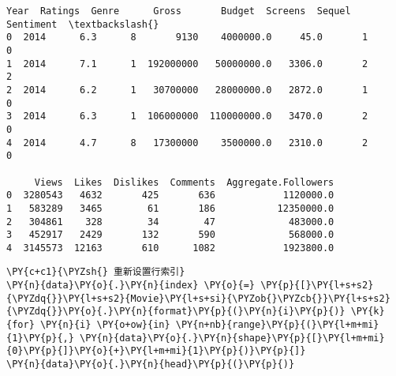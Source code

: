             \begin{tcolorbox}[breakable, size=fbox, boxrule=.5pt, pad at break*=1mm, opacityfill=0]
\begin{Verbatim}[commandchars=\\\{\}]
   Year  Ratings  Genre      Gross       Budget  Screens  Sequel  Sentiment  \textbackslash{}
0  2014      6.3      8       9130    4000000.0     45.0       1          0
1  2014      7.1      1  192000000   50000000.0   3306.0       2          2
2  2014      6.2      1   30700000   28000000.0   2872.0       1          0
3  2014      6.3      1  106000000  110000000.0   3470.0       2          0
4  2014      4.7      8   17300000    3500000.0   2310.0       2          0

     Views  Likes  Dislikes  Comments  Aggregate.Followers
0  3280543   4632       425       636            1120000.0
1   583289   3465        61       186           12350000.0
2   304861    328        34        47             483000.0
3   452917   2429       132       590             568000.0
4  3145573  12163       610      1082            1923800.0
\end{Verbatim}
\end{tcolorbox}
        
    \begin{tcolorbox}[breakable, size=fbox, boxrule=1pt, pad at break*=1mm,colback=cellbackground, colframe=cellborder]
\begin{Verbatim}[commandchars=\\\{\}]
\PY{c+c1}{\PYZsh{} 重新设置行索引}
\PY{n}{data}\PY{o}{.}\PY{n}{index} \PY{o}{=} \PY{p}{[}\PY{l+s+s2}{\PYZdq{}}\PY{l+s+s2}{Movie}\PY{l+s+si}{\PYZob{}\PYZcb{}}\PY{l+s+s2}{\PYZdq{}}\PY{o}{.}\PY{n}{format}\PY{p}{(}\PY{n}{i}\PY{p}{)} \PY{k}{for} \PY{n}{i} \PY{o+ow}{in} \PY{n+nb}{range}\PY{p}{(}\PY{l+m+mi}{1}\PY{p}{,} \PY{n}{data}\PY{o}{.}\PY{n}{shape}\PY{p}{[}\PY{l+m+mi}{0}\PY{p}{]}\PY{o}{+}\PY{l+m+mi}{1}\PY{p}{)}\PY{p}{]}
\PY{n}{data}\PY{o}{.}\PY{n}{head}\PY{p}{(}\PY{p}{)}
\end{Verbatim}
\end{tcolorbox}

